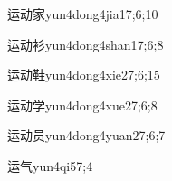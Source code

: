 \begin{verbete}{运动家}{yun4dong4jia1}{7;6;10}
\end{verbete}
\begin{verbete}{运动衫}{yun4dong4shan1}{7;6;8}
\end{verbete}
\begin{verbete}{运动鞋}{yun4dong4xie2}{7;6;15}
\end{verbete}
\begin{verbete}{运动学}{yun4dong4xue2}{7;6;8}
\end{verbete}
\begin{verbete}{运动员}{yun4dong4yuan2}{7;6;7}
\end{verbete}
\begin{verbete}{运气}{yun4qi5}{7;4}
\end{verbete}

